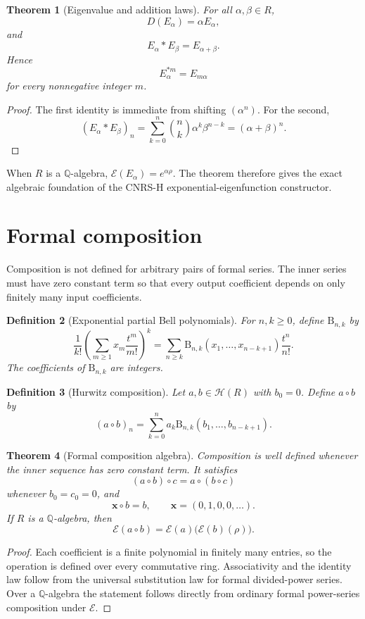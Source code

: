 \documentclass[11pt]{article}
\newtheorem{theorem}{Theorem}[section]
\newtheorem{definition}[theorem]{Definition}
\newcommand{\Hurs}{\mathcal H}
\newcommand{\Q}{\mathbb Q}
\newcommand{\Bell}{\mathrm B}
\begin{document}
\begin{theorem}[Eigenvalue and addition laws]
For all $\alpha,\beta\in R$,
\[
D(E_\alpha)=\alpha E_\alpha,
\]
and
\[
E_\alpha*E_\beta=E_{\alpha+\beta}.
\]
Hence
\[
E_\alpha^{*m}=E_{m\alpha}
\]
for every nonnegative integer $m$.
\end{theorem}

\begin{proof}
The first identity is immediate from shifting $(\alpha^n)$.  For the second,
\[
(E_\alpha*E_\beta)_n
=\sum_{k=0}^{n}\binom nk\alpha^k\beta^{n-k}
=(\alpha+\beta)^n.
\]
\end{proof}

When $R$ is a $\Q$-algebra, $\mathcal E(E_\alpha)=e^{\alpha\rho}$.  The theorem therefore gives the exact algebraic foundation of the CNRS-H exponential-eigenfunction constructor.

\section{Formal composition}

Composition is not defined for arbitrary pairs of formal series.  The inner series must have zero constant term so that every output coefficient depends on only finitely many input coefficients.

\begin{definition}[Exponential partial Bell polynomials]
For $n,k\ge0$, define $\Bell_{n,k}$ by
\[
\frac{1}{k!}\left(\sum_{m\ge1}x_m\frac{t^m}{m!}\right)^k
=\sum_{n\ge k}\Bell_{n,k}(x_1,\ldots,x_{n-k+1})\frac{t^n}{n!}.
\]
The coefficients of $\Bell_{n,k}$ are integers.
\end{definition}

\begin{definition}[Hurwitz composition]
Let $a,b\in\Hurs(R)$ with $b_0=0$.  Define $a\circ b$ by
\[
(a\circ b)_n
=\sum_{k=0}^{n}a_k\Bell_{n,k}(b_1,\ldots,b_{n-k+1}).
\]
\end{definition}

\begin{theorem}[Formal composition algebra]
Composition is well defined whenever the inner sequence has zero constant term.  It satisfies
\[
(a\circ b)\circ c=a\circ(b\circ c)
\]
whenever $b_0=c_0=0$, and
\[
\mathbf x\circ b=b,
\qquad
\mathbf x=(0,1,0,0,\ldots).
\]
If $R$ is a $\Q$-algebra, then
\[
\mathcal E(a\circ b)=\mathcal E(a)\bigl(\mathcal E(b)(\rho)\bigr).
\]
\end{theorem}

\begin{proof}
Each coefficient is a finite polynomial in finitely many entries, so the operation is defined over every commutative ring.  Associativity and the identity law follow from the universal substitution law for formal divided-power series.  Over a $\Q$-algebra the statement follows directly from ordinary formal power-series composition under $\mathcal E$.
\end{proof}
\end{document}
